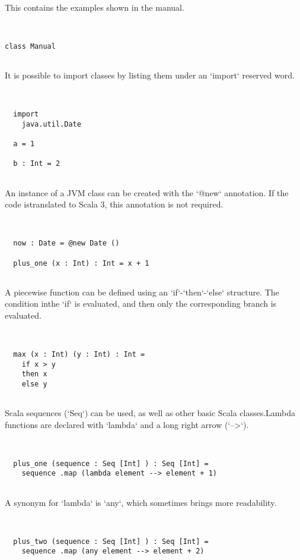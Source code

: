 \documentclass[12pt,a4paper]{article}
\begin{document}
  This contains the examples shown in the manual.


\begin{lstlisting}


class Manual


\end{lstlisting}

It is possible to import classes by listing them under an `import` reserved word. 


\begin{lstlisting}


  import
    java.util.Date

  a = 1

  b : Int = 2


\end{lstlisting}

An instance of a JVM class can be created with the `@new` annotation. If the code istranslated to Scala 3, this annotation is not required. 


\begin{lstlisting}


  now : Date = @new Date ()

  plus_one (x : Int) : Int = x + 1


\end{lstlisting}

A piecewise function can be defined using an `if`-`then`-`else` structure. The condition inthe `if` is evaluated, and then only the corresponding branch is evaluated. 


\begin{lstlisting}


  max (x : Int) (y : Int) : Int =
    if x > y
    then x
    else y


\end{lstlisting}

Scala sequences (`Seq`) can be used, as well as other basic Scala classes.Lambda functions are declared with `lambda` and a long right arrow (`-->`). 


\begin{lstlisting}


  plus_one (sequence : Seq [Int] ) : Seq [Int] =
    sequence .map (lambda element --> element + 1)


\end{lstlisting}

A synonym for `lambda` is `any`, which sometimes brings more readability. 


\begin{lstlisting}


  plus_two (sequence : Seq [Int] ) : Seq [Int] =
    sequence .map (any element --> element + 2)


\end{lstlisting}
\end{document}
